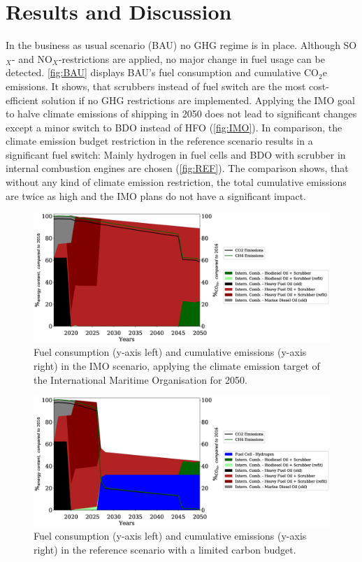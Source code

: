 \documentclass[article]{elsarticle}
\begin{document}
\section{Results and Discussion}
\label{sec:Results}
In the business as usual scenario (BAU) no GHG regime is in place. Although SO$_X$- and NO$_X$-restrictions are applied, no major change in fuel usage can be detected. \autoref{fig:BAU} displays BAU's fuel consumption and cumulative CO$_2$e emissions. It shows, that scrubbers instead of fuel switch are the most cost-efficient solution if no GHG restrictions are implemented. Applying the IMO goal to halve climate emissions of shipping in 2050 does not lead to significant changes except a minor switch to BDO instead of HFO (\autoref{fig:IMO}). In comparison, the climate emission budget restriction in the reference scenario  results in a significant fuel switch: Mainly hydrogen in fuel cells and BDO with scrubber in internal combustion engines are chosen (\autoref{fig:REF}). The comparison shows, that without any kind of climate emission restriction, the total cumulative emissions are twice as high and the IMO plans do not have a significant impact. 

\begin{figure}
    \centering
    \includegraphics[width=\textwidth]{figures/IMO_fuels_emissions.eps}
    \caption{Fuel consumption (y-axis left) and cumulative emissions (y-axis right) in the IMO scenario, applying the climate emission target of the International Maritime Organisation for 2050.}
    \label{fig:IMO}
\end{figure}

\begin{figure}
    \centering
    \includegraphics[width=\textwidth]{figures/RS_fuels_emissions.eps}
    \caption{Fuel consumption (y-axis left) and cumulative emissions (y-axis right) in the reference scenario with a limited carbon budget.}
    \label{fig:REF}
\end{figure}
\end{document}
